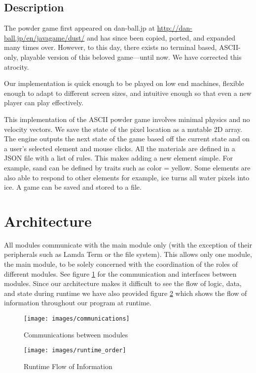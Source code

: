 \subsection{Description}
The powder game first appeared on dan-ball.jp at \url{http://dan-ball.jp/en/javagame/dust/} and has since been copied, ported, and expanded many times over. However, to this day, there exists no terminal based, ASCII-only, playable version of this beloved game---until now. We have corrected this atrocity.

Our implementation is quick enough to be played on low end machines, flexible enough to adapt to different screen sizes, and intuitive enough so that even a new player can play effectively. 

This implementation of the ASCII powder game involves minimal physics and no velocity vectors. We save the state of the pixel location as a mutable 2D array. The engine outputs the next state of the game based off the current state and on a user's selected element and mouse clicks. All the materials are defined in a JSON file with a list of rules. This makes adding a new element simple. For example, sand can be defined by traits such as color = yellow. Some elements are also able to respond to other elements for example, ice turns all water pixels into ice. A game can be saved and stored to a file.

\section{Architecture}
All modules communicate with the main module only (with the exception of their
peripherals such as Lamda Term or the file system). This allows only one module, the
main module, to be solely concerned with the coordination of the roles of different
modules. See figure \ref{fig:com} for the communication and interfaces between modules.
Since our architecture makes it difficult to see the flow of logic, data, and state during
runtime we have also provided figure \ref{fig:run} which shows the flow of information
throughout our program at runtime.

\begin{figure}[H]
  \caption{Communications between modules}
  \label{fig:com}
  \vspace{3em}
  \center\texttt{[image: images/communications]}
\end{figure}

\begin{figure}[H]
  \caption{Runtime Flow of Information}
  \label{fig:run}
  \vspace{3em}
  \texttt{[image: images/runtime\_order]}
\end{figure}

